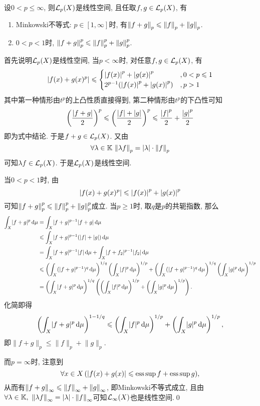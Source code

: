 	\begin{Theorem}
	设$ 0<p\leqslant\infty $, 则$ \mathcal{L}_p(X) $是线性空间, 且任取$ f, g\in\mathcal{L}_p(X) $, 有
	\begin{enumerate}[(1)]
	\item Minkowski不等式: $ p\in[1,\infty] $时, 有$ \left\| f+g \right\|_p\leqslant\left\| f \right\|_p+\left\| g \right\|_p $.
	\item $ 0<p<1 $时, $ \left\| f+g \right\|_p^p\leqslant \left\| f \right\|_p^p+\left\| g \right\|_p^p $.
	\end{enumerate}
	\end{Theorem}
	\begin{Proof}
	首先说明$ \mathcal{L}_p(X) $是线性空间, 当$ p<\infty $时, 对任意$ f, g\in\mathcal{L}_p(X) $, 有
	\[
	\left| f(x)+g(x)^p \right| \leqslant\begin{cases}
	\left| f(x) \right| ^p+\left| g(x) \right| ^p & ,0<p\leqslant 1\\
	2^{p-1}(\left| f(x) \right| ^p+\left| g(x) \right| ^p) & ,p>1
	\end{cases}
	\]
	其中第一种情形由$ t^p $的上凸性质直接得到, 第二种情形由$ t^p $的下凸性可知
	\[
	\left(\frac{\left| f+g \right| }{2}\right)^p\leqslant\left(\frac{\left| f \right| +\left| g \right| }{2}\right)^p\leqslant\frac{\left| f \right| ^p}{2}+\frac{\left| g \right| ^p}{2}
	\]
	即为式中结论. 于是$ f+g\in\mathcal{L}_p(X) $. 又由
	\[
	\forall\lambda\in\mathbb{K}\,\left\| \lambda f \right\|_p=\left| \lambda \right| \cdot\left\| f \right\|_p
	\]
	可知$ \lambda f\in\mathcal{L}_p(X) $. 于是$ \mathcal{L}_p(X) $是线性空间.
	
	当$ 0<p<1 $时, 由
	\[
		\left| f(x)+g(x)^p \right| \leqslant\left| f(x) \right| ^p+\left| g(x) \right| ^p
	\]
	可知$ \left\| f+g \right\|_p^p\leqslant \left\| f \right\|_p^p+\left\| g \right\|_p^p $成立. 当$ p\geqslant 1 $时, 取$ q $是$ p $的共轭指数, 那么
	\begin{align*}
		\int_X\lvert f+g\rvert^p\,\mathrm{d}\mu&=\int_X\lvert f+g\rvert^{p-1}\lvert f+g\rvert\,\mathrm{d}\mu\\
		&\leqslant\int_X\lvert f+g\rvert^{p-1}(\lvert f\rvert+\lvert g\rvert)\,\mathrm{d}\mu\\
		&=\int_X\lvert f+g\rvert^{p-1}\lvert f\rvert\,\mathrm{d}\mu+\int_X\lvert f+f_2\rvert^{p-1}\lvert f_2\rvert\,\mathrm{d}\mu\\
		&\leqslant\left( \int_X(\lvert f+g\rvert^{p-1})^q\,\mathrm{d}\mu \right)^{1/q}\left(\int_X\lvert f\rvert^p\,\mathrm{d}\mu\right)^{1/p}+\left( \int_X(\lvert f+g\rvert^{p-1})^q\,\mathrm{d}\mu \right)^{1/q}\left(\int_X\lvert g\rvert^p\,\mathrm{d}\mu\right)^{1/p}\\
		&=\left( \int_X\lvert f+g\rvert^p\,\mathrm{d}\mu \right)^{1/q}\left( \left( \int_X\lvert f\rvert^p\,\mathrm{d}\mu \right)^{1/p}+\left( \int_X\lvert g\rvert^p\,\mathrm{d}\mu \right)^{1/p} \right).
	\end{align*}
	化简即得
	\[
		\left( \int_X\lvert f+g\rvert^p\,\mathrm{d}\mu \right)^{1-1/q}\leqslant\left( \int_X\lvert f\rvert^p\,\mathrm{d}\mu \right)^{1/p}+\left( \int_X\lvert g\rvert^p\,\mathrm{d}\mu \right)^{1/p},
	\]
	即$ \lVert f+g\rVert_p\leqslant\lVert f\rVert_p+\lVert g\rVert_p $.
	
	而$ p=\infty $时, 注意到
	\[
		\forall x\in X\,(\left| f(x)+g(x) \right| \leqslant\operatorname{ess\,sup} f+\operatorname{ess\,sup} g),
	\]
	从而有$ \left\| f+g \right\|_\infty\leqslant\left\| f \right\|_\infty+\left\| g \right\|_\infty $, 即Minkowski不等式成立, 且由$ \forall\lambda\in\mathbb{K},\ \left\| \lambda f \right\|_\infty=\left| \lambda \right| \cdot\left\| f \right\|_\infty $可知$ \mathcal{L}_\infty(X) $也是线性空间.\qed
	\end{Proof}
	
